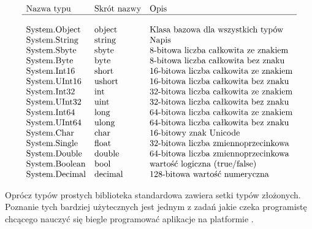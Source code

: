 \begin{center}
$$\begin{array}{lll}
\mbox{Nazwa typu} & \mbox{Skrót nazwy} & \mbox{Opis} \\
\hline \\
\mbox{System.Object}  & \mbox{object} & \mbox{Klasa bazowa dla wszystkich typów} \\
\mbox{System.String}  & \mbox{string} & \mbox{Napis} \\ 
\mbox{System.Sbyte}   & \mbox{sbyte}  & \mbox{8-bitowa liczba całkowita ze znakiem}  \\
\mbox{System.Byte}    & \mbox{byte}   & \mbox{8-bitowa liczba całkowita bez znaku}   \\
\mbox{System.Int16}   & \mbox{short}  & \mbox{16-bitowa liczba całkowita ze znakiem} \\
\mbox{System.UInt16}  & \mbox{ushort} & \mbox{16-bitowa liczba całkowita bez znaku} \\
\mbox{System.Int32}   & \mbox{int}    & \mbox{32-bitowa liczba całkowita ze znakiem} \\
\mbox{System.UInt32}  & \mbox{uint}   & \mbox{32-bitowa liczba całkowita bez znaku} \\
\mbox{System.Int64}   & \mbox{long}   & \mbox{64-bitowa liczba całkowita ze znakiem} \\
\mbox{System.UInt64}  & \mbox{ulong}  & \mbox{64-bitowa liczba całkowita bez znaku} \\
\mbox{System.Char}    & \mbox{char}   & \mbox{16-bitowy znak Unicode} \\
\mbox{System.Single}  & \mbox{float}  & \mbox{32-bitowa liczba zmiennoprzecinkowa} \\ 
\mbox{System.Double}  & \mbox{double} & \mbox{64-bitowa liczba zmiennoprzecinkowa} \\ 
\mbox{System.Boolean} & \mbox{bool}   & \mbox{wartość logiczna (true/false)} \\
\mbox{System.Decimal} & \mbox{decimal} & \mbox{128-bitowa wartość numeryczna}
\end{array}$$
\end{center}

Oprócz typów prostych biblioteka standardowa zawiera setki typów złożonych. Poznanie 
tych bardziej użytecznych jest jednym z zadań jakie czeka programistę chcącego nauczyć się
biegle programować aplikacje na platformie \NET{}.
